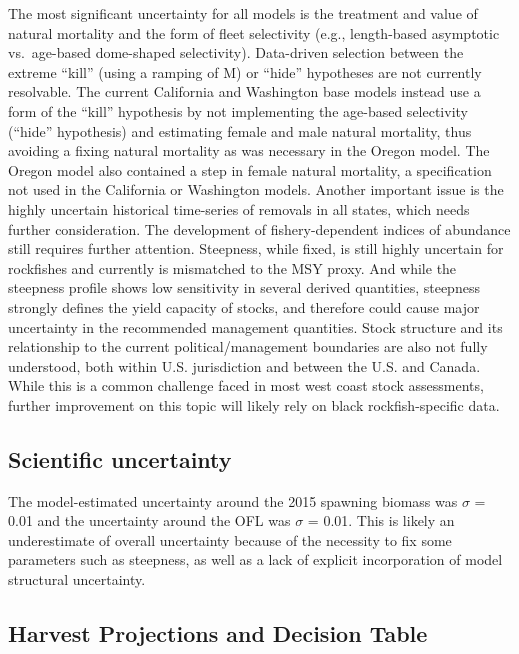 \documentclass[11pt,
  english,
  letterpaper,
]{article}
\begin{document}
The most significant uncertainty for all models is the treatment and value of natural mortality and the form of fleet selectivity (e.g., length-based asymptotic vs.~age-based dome-shaped selectivity). Data-driven selection between the extreme ``kill'' (using a ramping of M) or ``hide'' hypotheses are not currently resolvable. The current California and Washington base models instead use a form of the ``kill'' hypothesis by not implementing the age-based selectivity (``hide'' hypothesis) and estimating female and male natural mortality, thus avoiding a fixing natural mortality as was necessary in the Oregon model. The Oregon model also contained a step in female natural mortality, a specification not used in the California or Washington models. Another important issue is the highly uncertain historical time-series of removals in all states, which needs further consideration. The development of fishery-dependent indices of abundance still requires further attention. Steepness, while fixed, is still highly uncertain for rockfishes and currently is mismatched to the MSY proxy. And while the steepness profile shows low sensitivity in several derived quantities, steepness strongly defines the yield capacity of stocks, and therefore could cause major uncertainty in the recommended management quantities. Stock structure and its relationship to the current political/management boundaries are also not fully understood, both within U.S. jurisdiction and between the U.S. and Canada. While this is a common challenge faced in most west coast stock assessments, further improvement on this topic will likely rely on black rockfish-specific data.

\hypertarget{scientific-uncertainty}{%
\subsection*{Scientific uncertainty}\label{scientific-uncertainty}}

The model-estimated uncertainty around the 2015 spawning biomass was \(\sigma\) = 0.01 and the uncertainty around the OFL was \(\sigma\) = 0.01. This is likely an underestimate of overall uncertainty because of the necessity to fix some parameters such as steepness, as well as a lack of explicit incorporation of model structural uncertainty.

\hypertarget{harvest-projections-and-decision-table}{%
\subsection*{Harvest Projections and Decision Table}\label{harvest-projections-and-decision-table}}
\end{document}
